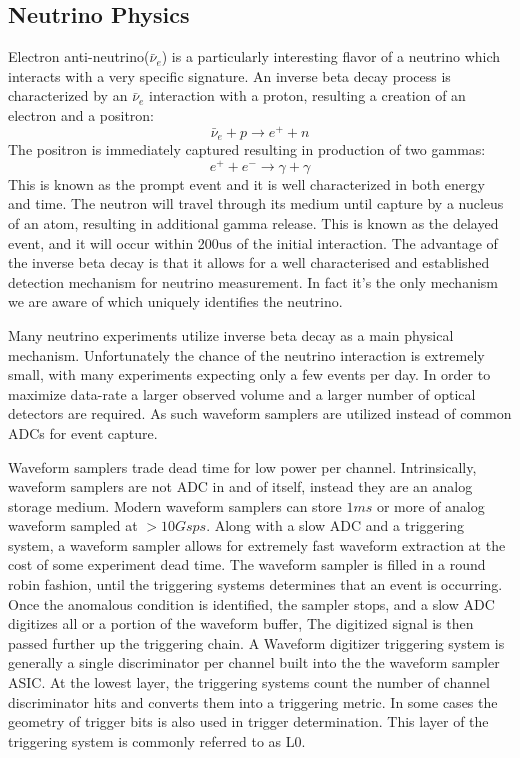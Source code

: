\subsection{Neutrino Physics}\label{subsec:neutrino-physics}
Electron anti-neutrino($\bar{\nu}_e$) is a particularly interesting flavor of a neutrino which interacts with a very specific signature.
An inverse beta decay process is characterized by an $\bar{\nu}_e$ interaction with a proton, resulting a creation of an electron and a positron:
\begin{equation}
    \bar{\nu}_e+p\rightarrow e^++n
\end{equation}
The positron is immediately captured resulting in production of two gammas:
\begin{equation}
    e^+ +e^- \rightarrow \gamma + \gamma
\end{equation}
This is known as the prompt event and it is well characterized in both energy and time.
The neutron will travel through its medium until capture by a nucleus of an atom, resulting in additional gamma release.
This is known as the delayed event, and it will occur within 200us of the initial interaction.
The advantage of the inverse beta decay is that it allows for a well characterised and established detection mechanism for neutrino measurement.
In fact it's the only mechanism we are aware of which uniquely identifies the neutrino.

Many neutrino experiments utilize inverse beta decay as a main physical mechanism.\cite{abe2008precision}\cite{li2016invited}
Unfortunately the chance of the neutrino interaction is extremely small, with many experiments expecting only a few events per day.
In order to maximize data-rate a larger observed volume and a larger number of optical detectors are required.
As such waveform samplers are utilized instead of common ADCs for event capture.

Waveform samplers trade dead time for low power per channel.
Intrinsically, waveform samplers are not ADC in and of itself, instead they are an analog storage medium.
Modern waveform samplers can store $1ms$ or more of analog waveform sampled at $>10Gsps$.
Along with a slow ADC and a triggering system, a waveform sampler allows for extremely fast waveform extraction at the cost of some experiment dead time.
The waveform sampler is filled in a round robin fashion, until the triggering systems determines that an event is occurring.
Once the anomalous condition is identified, the sampler stops, and a slow ADC digitizes all or a portion of the waveform buffer,
The digitized signal is then passed further up the triggering chain.
A Waveform digitizer triggering system is generally a single discriminator per channel built into the the waveform sampler ASIC.
At the lowest layer, the triggering systems count the number of channel discriminator hits and converts them into a triggering metric.
In some cases the geometry of trigger bits is also used in trigger determination.
This layer of the triggering system is commonly referred to as L0.

